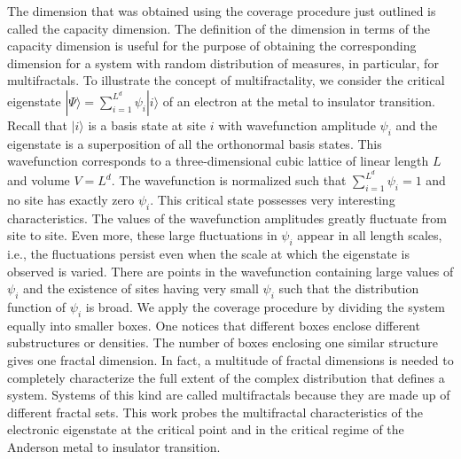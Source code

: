 The dimension that was obtained using the coverage procedure just outlined is called the capacity dimension.  The definition of the dimension in terms of the capacity dimension is useful for the purpose of obtaining the corresponding dimension for a system with random distribution of measures, in particular, for multifractals.
To illustrate the concept of multifractality, we consider the critical eigenstate $|\Psi\rangle=\sum_{i=1}^{L^d}\psi_i|i\rangle$ of an electron at the metal to insulator transition.
Recall that $\vert i\rangle$ is a basis state at site $i$ with wavefunction amplitude $\psi_i$ and the eigenstate is a superposition of all the orthonormal basis states.  This wavefunction corresponds to a three-dimensional cubic lattice of linear length $L$ and volume $V=L^d$.  The wavefunction is normalized such that $\sum_{i=1}^{L^d}\psi_i=1$ and no site has exactly zero $\psi_i$.  This critical state possesses very interesting characteristics.  The values of the wavefunction amplitudes greatly fluctuate from site to site.  Even more, these large fluctuations in $\psi_i$ appear in all length scales, i.e., the fluctuations persist even when the scale at which the eigenstate is observed is varied.  There are points in the wavefunction containing large values of $\psi_i$ and the existence of sites having very small $\psi_i$ such that the distribution function of $\psi_i$ is broad. 
We apply the coverage procedure by dividing the system equally into smaller boxes.  One notices that different boxes enclose different substructures or densities.  The number of boxes enclosing one similar structure gives one fractal dimension.  In fact, a multitude of fractal dimensions is needed to completely characterize the full extent of the complex distribution that defines a system.  Systems of this kind are called multifractals because they are made up of different fractal sets.
This work probes the multifractal characteristics of the electronic eigenstate at the critical point and in the critical regime of the Anderson metal to insulator transition.



















